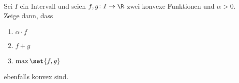 \begin{exercise} %
  Sei $I$ ein Intervall und seien $f,g \colon I \to \R$ zwei konvexe Funktionen
  und $\alpha > 0$. Zeige dann, dass
  \begin{enumerate}[label=(\alph*)]
  \item $\alpha \cdot f$
  \item $f + g$
  \item $\max\set{f,g}$
  \end{enumerate}
  ebenfalls konvex sind.
\end{exercise}
